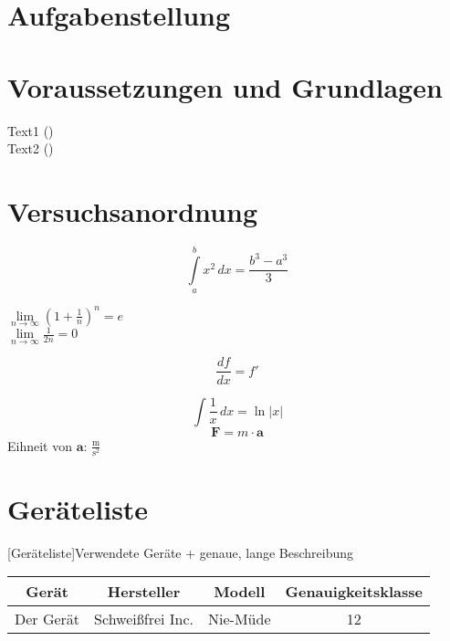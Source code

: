 \documentclass[11pt]{scrartcl}
\newcommand{\mss}{\(\frac{\text{m}}{\text{s}^2}\)}  %
\begin{document}
%

\tableofcontents
\newpage

\section{Aufgabenstellung}
\label{sec:aufgabenstellung}

\section{Voraussetzungen und Grundlagen}
\label{sec:voraussetzungen-rundlagen}

Text1 (\cite[S. 1000]{ref:dem1}) \\
Text2 (\cite[Kapitel 74]{ref:knoll})


\section{Versuchsanordnung}
\label{sec:versuchsanordnung}

\begin{equation}
\label{eq:grenzen-oben-unten}
    \int \limits_{a}^{b} x^2 \, dx =\frac{b^3-a^3}{3}  %
\end{equation}

\(\lim \limits_{n \to \infty} \left( 1 + \frac{1}{n} \right) ^{n} = e\)  \\ %
$\lim \limits_{n \to \infty} \frac{1}{2n} = 0$  %

\begin{displaymath}
    \frac{df}{dx} = f'
\end{displaymath}

\[ \int \frac{1}{x} \, dx = \ln|x| \]  %
$$ \textbf{F} = m \cdot \textbf{a} $$  %
Eihneit von $\textbf{a}$: \mss

\section{Geräteliste}
\label{sec:geraeteliste}

\begin{center}
[Geräteliste]{Verwendete Geräte + genaue, lange Beschreibung}  %
\label{tab:geraeteliste}
    \begin{tabular}{|c|c|c|c|} \hline
        Gerät & Hersteller & Modell & Genauigkeitsklasse \\ \hline
        Der Gerät & Schweißfrei Inc. & Nie-Müde & 12 \\ \hline
    \end{tabular}
\end{center}
\end{document}
